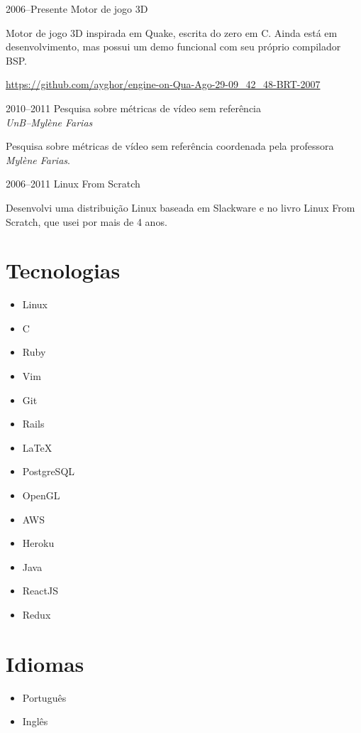\documentclass[a4paper,twoside]{simplecv}
\begin{document}
\begin{topic}
\item[2006--Presente] Motor de jogo 3D

	Motor de jogo 3D inspirada em Quake, escrita do zero em C. Ainda está
	em desenvolvimento, mas possui um demo funcional com seu próprio
	compilador BSP.

	{\scriptsize\url{https://github.com/ayghor/engine-on-Qua-Ago-29-09\_42\_48-BRT-2007}}

\item[2010--2011] Pesquisa sobre métricas de vídeo sem referência\\
	{\em\small UnB--Mylène Farias}

	Pesquisa sobre métricas de vídeo sem referência coordenada pela
	professora \emph{Mylène Farias}.

\item[2006--2011] Linux From Scratch

	Desenvolvi uma distribuição Linux baseada em Slackware e no livro Linux
	From Scratch, que usei por mais de 4 anos.
\end{topic}

\section{Tecnologias}

\begin{multicols}{4}
	\raggedcolumns
	\begin{itemize}
		\item Linux
		\item C
		\item Ruby
		\item Vim
		\item Git
		\item Rails
		\item \LaTeX{}
		\item PostgreSQL
		\item OpenGL
		\item AWS
		\item Heroku
		\item Java
		\item ReactJS
		\item Redux
	\end{itemize}
\end{multicols}

\section{Idiomas}

\begin{multicols}{4}
	\raggedcolumns
	\begin{itemize}
		\item Português
		\item Inglês
	\end{itemize}
\end{multicols}

%
\end{document}
